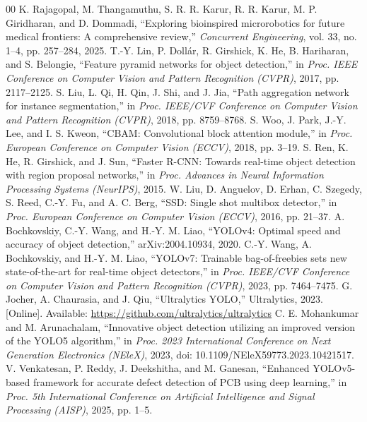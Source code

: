 \documentclass[conference]{IEEEtran}
\begin{document}
\footnotesize
\begin{thebibliography}{00}
 K. Rajagopal, M. Thangamuthu, S. R. R. Karur, R. R. Karur, M. P. Giridharan, and D. Dommadi, ``Exploring bioinspired microrobotics for future medical frontiers: A comprehensive review,'' \textit{Concurrent Engineering}, vol. 33, no. 1--4, pp. 257--284, 2025.
 T.-Y. Lin, P. Doll\'ar, R. Girshick, K. He, B. Hariharan, and S. Belongie, ``Feature pyramid networks for object detection,'' in \textit{Proc. IEEE Conference on Computer Vision and Pattern Recognition (CVPR)}, 2017, pp. 2117--2125.
 S. Liu, L. Qi, H. Qin, J. Shi, and J. Jia, ``Path aggregation network for instance segmentation,'' in \textit{Proc. IEEE/CVF Conference on Computer Vision and Pattern Recognition (CVPR)}, 2018, pp. 8759--8768.
 S. Woo, J. Park, J.-Y. Lee, and I. S. Kweon, ``CBAM: Convolutional block attention module,'' in \textit{Proc. European Conference on Computer Vision (ECCV)}, 2018, pp. 3--19.
 S. Ren, K. He, R. Girshick, and J. Sun, ``Faster R-CNN: Towards real-time object detection with region proposal networks,'' in \textit{Proc. Advances in Neural Information Processing Systems (NeurIPS)}, 2015.
 W. Liu, D. Anguelov, D. Erhan, C. Szegedy, S. Reed, C.-Y. Fu, and A. C. Berg, ``SSD: Single shot multibox detector,'' in \textit{Proc. European Conference on Computer Vision (ECCV)}, 2016, pp. 21--37.
 A. Bochkovskiy, C.-Y. Wang, and H.-Y. M. Liao, ``YOLOv4: Optimal speed and accuracy of object detection,'' arXiv:2004.10934, 2020.
 C.-Y. Wang, A. Bochkovskiy, and H.-Y. M. Liao, ``YOLOv7: Trainable bag-of-freebies sets new state-of-the-art for real-time object detectors,'' in \textit{Proc. IEEE/CVF Conference on Computer Vision and Pattern Recognition (CVPR)}, 2023, pp. 7464--7475.
 G. Jocher, A. Chaurasia, and J. Qiu, ``Ultralytics YOLO,'' Ultralytics, 2023. [Online]. Available: \url{https://github.com/ultralytics/ultralytics}
 C. E. Mohankumar and M. Arunachalam, ``Innovative object detection utilizing an improved version of the YOLO5 algorithm,'' in \textit{Proc. 2023 International Conference on Next Generation Electronics (NEleX)}, 2023, doi: 10.1109/NEleX59773.2023.10421517.
 V. Venkatesan, P. Reddy, J. Deekshitha, and M. Ganesan, ``Enhanced YOLOv5-based framework for accurate defect detection of PCB using deep learning,'' in \textit{Proc. 5th International Conference on Artificial Intelligence and Signal Processing (AISP)}, 2025, pp. 1--5.

\end{thebibliography}
\end{document}
